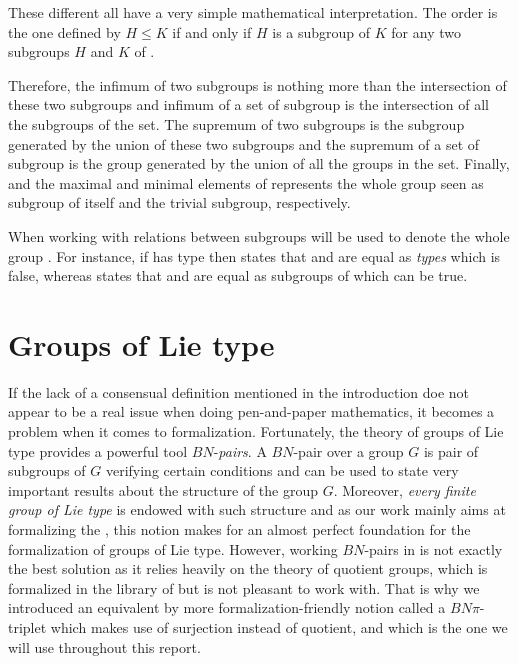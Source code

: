 These different all have a very simple mathematical interpretation. The order is the one defined by $H \le K$ if and only if $H$ is a subgroup of $K$ for any two subgroups $H$ and $K$ of .

Therefore, the infimum of two subgroups is nothing more than the intersection of these two subgroups and infimum of a set of subgroup is the intersection of all the subgroups of the set. The supremum of two subgroups is the subgroup generated by the union of these two subgroups and the supremum of a set of subgroup is the group generated by the union of all the groups in the set. Finally,  and  the maximal and minimal elements of  represents the whole group  seen as subgroup of itself and the trivial subgroup, respectively.

\begin{remarque}
    When working with relations between subgroups  will be used to denote the whole group . For instance, if  has type  then  states that  and  are equal as \emph{types} which is false, whereas  states that  and  are equal as subgroups of  which can be true.
\end{remarque}

\section{Groups of Lie type}
\label{sec:BN}



If the lack of a consensual definition mentioned in the introduction doe not appear to be a real issue when doing pen-and-paper mathematics, it becomes a problem when it comes to formalization. Fortunately, the theory of groups of Lie type provides a powerful tool $BN$-\emph{pairs}. A $BN$-pair over a group $G$ is pair of subgroups of $G$ verifying certain conditions and can be used to state very important results about the structure of the group $G$. Moreover, \emph{every finite group of Lie type} is endowed with such structure and as our work mainly aims at formalizing the \CFSG, this notion makes for an almost perfect foundation for the formalization of groups of Lie type. 
However, working $BN$-pairs in \Lean is not exactly the best solution as it relies heavily on the theory of quotient groups, which is formalized in the \href{https://github.com/leanprover-community/mathlib4}{} library of \Lean but is not pleasant to work with. That is why we introduced an equivalent by more formalization-friendly notion called a $BN\pi$-triplet which makes use of surjection instead of quotient, and which is the one we will use throughout this report.


